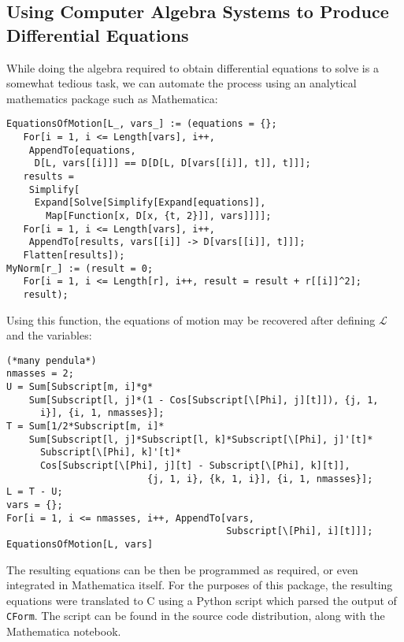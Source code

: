 \documentclass{article}
\newcommand{\lagrangian}{\ensuremath{\mathcal{L}}}
\begin{document}
\subsection{Using Computer Algebra Systems to Produce Differential Equations}
While doing the algebra required to obtain differential equations to solve is a somewhat tedious task, we can automate the process using an analytical mathematics package such as Mathematica:
\begin{verbatim}
EquationsOfMotion[L_, vars_] := (equations = {}; 
   For[i = 1, i <= Length[vars], i++, 
    AppendTo[equations, 
     D[L, vars[[i]]] == D[D[L, D[vars[[i]], t]], t]]]; 
   results = 
    Simplify[
     Expand[Solve[Simplify[Expand[equations]], 
       Map[Function[x, D[x, {t, 2}]], vars]]]];
   For[i = 1, i <= Length[vars], i++,
    AppendTo[results, vars[[i]] -> D[vars[[i]], t]]];
   Flatten[results]);
MyNorm[r_] := (result = 0; 
   For[i = 1, i <= Length[r], i++, result = result + r[[i]]^2]; 
   result);
\end{verbatim}
Using this function, the equations of motion may be recovered after defining \lagrangian{} and the variables:
\begin{verbatim}
(*many pendula*)
nmasses = 2;
U = Sum[Subscript[m, i]*g*
    Sum[Subscript[l, j]*(1 - Cos[Subscript[\[Phi], j][t]]), {j, 1, 
      i}], {i, 1, nmasses}];
T = Sum[1/2*Subscript[m, i]*
    Sum[Subscript[l, j]*Subscript[l, k]*Subscript[\[Phi], j]'[t]*
      Subscript[\[Phi], k]'[t]*
      Cos[Subscript[\[Phi], j][t] - Subscript[\[Phi], k][t]], 
                         {j, 1, i}, {k, 1, i}], {i, 1, nmasses}];
L = T - U;
vars = {};
For[i = 1, i <= nmasses, i++, AppendTo[vars, 
                                       Subscript[\[Phi], i][t]]];
EquationsOfMotion[L, vars]
\end{verbatim}
The resulting equations can be then be programmed as required, or even integrated in Mathematica itself. For the purposes of this package, the resulting equations were translated to C using a Python script which parsed the output of \verb#CForm#. The script can be found in the source code distribution, along with the Mathematica notebook.
\end{document}
